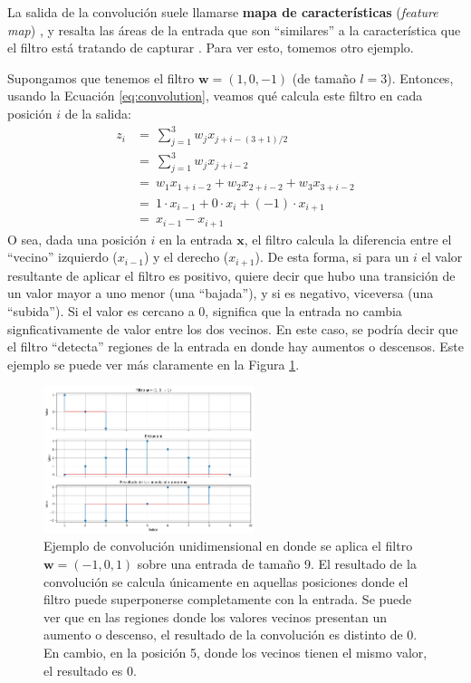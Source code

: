 \documentclass[../../main.tex]{subfiles}
\begin{document}
La salida de la convolución suele llamarse \textbf{mapa de características}
(\textit{feature map}) \cite{deep-learning}, y resalta las áreas de la entrada que son
``similares'' a la característica que el filtro está tratando de capturar
\cite{hands-on-ML-sklearn-tf}. Para ver esto, tomemos otro ejemplo.

Supongamos que tenemos el filtro \(\bm{w} = (1, 0, -1)\) (de tamaño \(l=3\)). Entonces,
usando la Ecuación \ref{eq:convolution}, veamos qué calcula este filtro en cada
posición \(i\) de la salida:
\begin{align*}
    z_i &=\ \sum_{j=1}^3 w_j x_{j+i-(3+1)/2} \\
        &=\ \sum_{j=1}^3 w_j x_{j+i-2} \\
        &=\ w_1 x_{1+i-2} + w_2 x_{2+i-2} + w_3 x_{3+i-2} \\
        &=\ 1 \cdot x_{i-1} + 0 \cdot x_i + (-1) \cdot x_{i+1} \\
        &=\ x_{i-1} - x_{i+1}
\end{align*}
O sea, dada una posición \(i\) en la entrada \(\bm{x}\), el filtro calcula la diferencia
entre el ``vecino'' izquierdo (\(x_{i-1}\)) y el derecho (\(x_{i+1}\)). De esta forma, si
para un \(i\) el valor resultante de aplicar el filtro es positivo, quiere decir que hubo
una transición de un valor mayor a uno menor (una ``bajada''), y si es negativo, viceversa
(una ``subida''). Si el valor es cercano a 0, significa que la entrada no cambia
signficativamente de valor entre los dos vecinos. En este caso, se podría decir que el
filtro ``detecta'' regiones de la entrada en donde hay aumentos o descensos. Este ejemplo
se puede ver más claramente en la Figura \ref{fig:conv-example}.

\begin{figure}
    \centering
    \includegraphics[width=0.55\textwidth]{figs/ejemplo_convolucion.png}
    \caption{Ejemplo de convolución unidimensional en donde se aplica el filtro \(\bm{w} =
    (-1,0,1)\) sobre una entrada de tamaño 9. El resultado de la convolución se calcula
    únicamente en aquellas posiciones donde el filtro puede superponerse completamente con
    la entrada. Se puede ver que en las regiones donde los valores vecinos presentan un
    aumento o descenso, el resultado de la convolución es distinto de 0. En cambio, en
    la posición 5, donde los vecinos tienen el mismo valor, el resultado es 0.}
    \label{fig:conv-example}
\end{figure}
\end{document}
